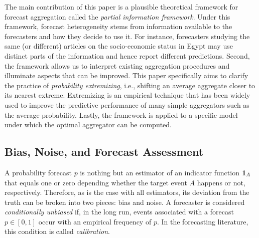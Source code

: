 \documentclass[12pt]{article}
\theoremstyle{definition}
\theoremstyle{definition}
\def\one{{\bf 1}}
\begin{document}
The main contribution of this paper is a plausible
theoretical framework for forecast aggregation called the \textit{partial information framework}. Under this framework, forecast heterogeneity stems from information available to the forecasters and how they decide to use it. For instance, forecasters studying the same (or different) articles on the socio-economic status in Egypt may use distinct parts of the information and hence report different predictions. 
Second, the framework allows us to interpret existing aggregation procedures and illuminate aspects
that can be improved. This paper specifically aims to clarify the practice of {\em probability
extremizing}, i.e., shifting an average aggregate closer to its nearest
extreme. Extremizing is an empirical technique that has been widely used to
improve the predictive performance of many simple aggregators such as
the average probability. Lastly, the framework is applied to a
specific model under which the optimal aggregator can be computed.

\subsection{Bias, Noise, and Forecast Assessment}
\label{BiasNoise}
A probability forecast $p$ is nothing but an
estimator of an indicator function $\one_A$ that equals one or zero depending whether the target event $A$
happens or not, respectively. Therefore, as is the case with
all estimators, its deviation from the truth can be broken into two
pieces: bias and noise. A forecaster
is considered \textit{conditionally unbiased} if, in the long run, events associated
with a forecast $p \in [0,1]$ occur with an empirical frequency of $p$. 
In the forecasting literature, this condition is called \textit{calibration}.

\end{document}
